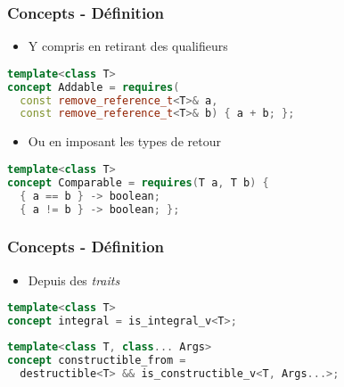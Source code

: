\documentclass[C++.tex]{subfiles}
\begin{document}
\begin{frame}[fragile]
	\frametitle{Concepts - Définition}
	\begin{itemize}
		\item Y compris en retirant des qualifieurs
	\end{itemize}

	\begin{lstlisting}[language=C++]
template<class T>
concept Addable = requires(
  const remove_reference_t<T>& a,
  const remove_reference_t<T>& b) { a + b; };\end{lstlisting}

	\begin{itemize}
		\item Ou en imposant les types de retour
	\end{itemize}

	\begin{lstlisting}[language=C++]
template<class T>
concept Comparable = requires(T a, T b) {
  { a == b } -> boolean;
  { a != b } -> boolean; };\end{lstlisting}
\end{frame}

\begin{frame}[fragile]
	\frametitle{Concepts - Définition}
	\begin{itemize}
		\item Depuis des \textit{traits}
	\end{itemize}

	\begin{lstlisting}[language=C++]
template<class T>
concept integral = is_integral_v<T>;\end{lstlisting}

	\begin{lstlisting}[language=C++]
template<class T, class... Args>
concept constructible_from = 
  destructible<T> && is_constructible_v<T, Args...>;\end{lstlisting}
\end{frame}
\end{document}

